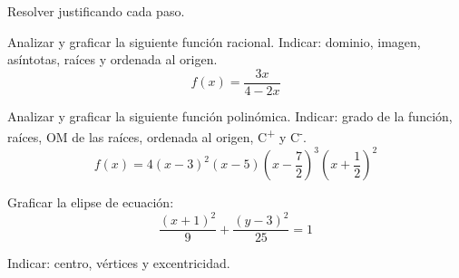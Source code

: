 \documentclass[12pt]{exam}
\begin{document}
\begin{questions}
\question Resolver justificando cada paso.

\question Analizar y graficar la siguiente función racional. Indicar: dominio, imagen, asíntotas, raíces y ordenada al origen. 
    \[f(x) = \frac{3x}{4-2x}\]

\question Analizar y graficar la siguiente función polinómica. Indicar: grado de la función, raíces, OM de las raíces, ordenada al origen, C\textsuperscript{+} y C\textsuperscript{-}.
    \[f(x) = 4(x-3)^2 (x-5) \left( x-\frac{7}{2} \right)^3 \left( x+\frac{1}{2} \right)^2\]

\question Graficar la elipse de ecuación:  $$ \dfrac{(x+1)^2}{9} + \dfrac{(y-3)^2}{25} = 1$$ 
    
    Indicar: centro, vértices y excentricidad.

\end{questions}
\end{document}
